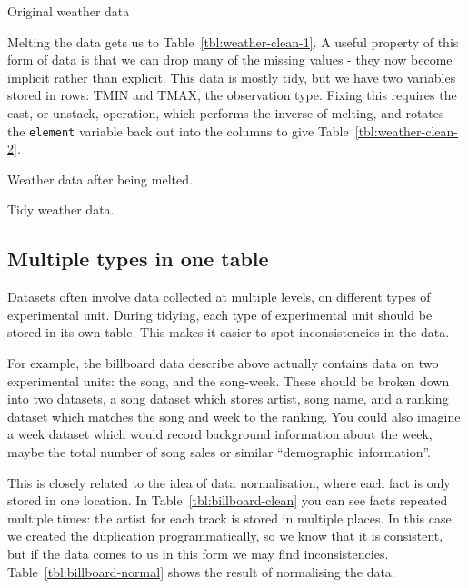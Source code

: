 \documentclass[oneside]{article}
\begin{document}
\begin{table}[htbp]
  \centering
  
  \caption{Original weather data}
  \label{tbl:weather-raw}
\end{table}

Melting the data gets us to Table~\ref{tbl:weather-clean-1}.  A useful property of this form of data is that we can drop many of the missing values - they now become implicit rather than explicit. This data is mostly tidy, but we have two variables stored in rows: TMIN and TMAX, the observation type. Fixing this requires the cast, or unstack, operation, which performs the inverse of melting, and rotates the {\tt element} variable back out into the columns to give Table~\ref{tbl:weather-clean-2}.

\begin{table}[htbp]
  \centering
  
  \caption{Weather data after being melted.}
  \label{tbl:weather-clean-1}
\end{table}

\begin{table}[htbp]
  \centering
  
  \caption{Tidy weather data.}
  \label{tbl:weather-clean-2}
\end{table}

\subsection{Multiple types in one table}

Datasets often involve data collected at multiple levels, on different types of experimental unit. During tidying, each type of experimental unit should be stored in its own table. This makes it easier to spot inconsistencies in the data.  

For example, the billboard data describe above actually contains data on two experimental units: the song, and the song-week. These should be broken down into two datasets, a song dataset which stores artist, song name, and a ranking dataset which matches the song and week to the ranking.  You could also imagine a week dataset which would record background information about the week, maybe the total number of song sales or similar ``demographic information''.

This is closely related to the idea of data normalisation, where each fact is only stored in one location. In Table~\ref{tbl:billboard-clean} you can see facts repeated multiple times: the artist for each track is stored in multiple places. In this case we created the duplication programmatically, so we know that it is consistent, but if the data comes to us in this form we may find inconsistencies. Table~\ref{tbl:billboard-normal} shows the result of normalising the data.
\end{document}
